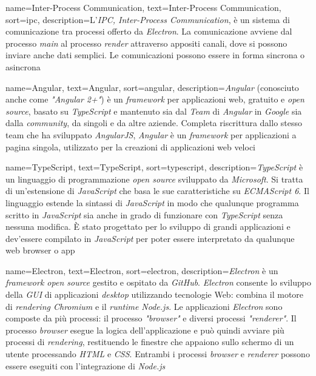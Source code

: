  {
    name=Inter-Process Communication,
    text=Inter-Process Communication,
    sort=ipc,
    description={L'\emph{IPC, Inter-Process Communication}, è un sistema di comunicazione tra processi offerto da \emph{Electron}. La comunicazione avviene dal processo \emph{main} al processo \emph{render} attraverso appositi canali, dove si possono inviare anche dati semplici. Le comunicazioni possono essere in forma sincrona o asincrona}
}

 {
    name=Angular,
    text=Angular,
    sort=angular,
    description={\emph{Angular} (conosciuto anche come \emph{"Angular 2+"}) è un \emph{framework} per applicazioni web, gratuito e \emph{open source}, basato su \emph{TypeScript} e mantenuto sia dal \emph{Team} di \emph{Angular} in \emph{Google} sia dalla \emph{community}, da singoli e da altre aziende. Completa riscrittura dallo stesso team che ha sviluppato \emph{AngularJS}, \emph{Angular} è un \emph{framework} per applicazioni a pagina singola, utilizzato per la creazioni di applicazioni web veloci}
}

 {
    name=TypeScript,
    text=TypeScript,
    sort=typescript,
    description={\emph{TypeScript} è un linguaggio di programmazione \emph{open source} sviluppato da \emph{Microsoft}. Si tratta di un'estensione di \emph{JavaScript} che basa le sue caratteristiche su \emph{ECMAScript 6}. Il linguaggio estende la sintassi di \emph{JavaScript} in modo che qualunque programma scritto in \emph{JavaScript} sia anche in grado di funzionare con \emph{TypeScript} senza nessuna modifica. È stato progettato per lo sviluppo di grandi applicazioni e dev'essere compilato in \emph{JavaScript} per poter essere interpretato da qualunque web browser o app}
}

 {
    name=Electron,
    text=Electron,
    sort=electron,
    description={\emph{Electron} è un \emph{framework open source} gestito e ospitato da \emph{GitHub}. \emph{Electron} consente lo sviluppo della \emph{GUI} di applicazioni \emph{desktop} utilizzando tecnologie Web: combina il motore di \emph{rendering Chromium} e il \emph{runtime Node.js}. Le applicazioni \emph{Electron} sono composte da più processi: il processo \emph{"browser"} e diversi processi \emph{"renderer"}. Il processo \emph{browser} esegue la logica dell'applicazione e può quindi avviare più processi di \emph{rendering}, restituendo le finestre che appaiono sullo schermo di un utente processando \emph{HTML} e \emph{CSS}. Entrambi i processi \emph{browser} e \emph{renderer} possono essere eseguiti con l'integrazione di \emph{Node.js}}
}

